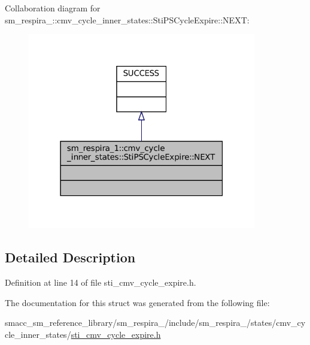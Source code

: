 Collaboration diagram for sm\+\_\+respira\+\_\+:\+:cmv\+\_\+cycle\+\_\+inner\+\_\+states\+:\+:Sti\+P\+S\+Cycle\+Expire\+:\+:N\+E\+XT\+:
\nopagebreak
\begin{figure}[H]
\begin{center}
\leavevmode
\includegraphics[width=283pt]{structsm__respira__1_1_1cmv__cycle__inner__states_1_1StiPSCycleExpire_1_1NEXT__coll__graph}
\end{center}
\end{figure}


\subsection{Detailed Description}


Definition at line 14 of file sti\+\_\+cmv\+\_\+cycle\+\_\+expire.\+h.



The documentation for this struct was generated from the following file\+:\begin{DoxyCompactItemize}
\item 
smacc\+\_\+sm\+\_\+reference\+\_\+library/sm\+\_\+respira\+\_/include/sm\+\_\+respira\+\_/states/cmv\+\_\+cycle\+\_\+inner\+\_\+states/\hyperlink{sti__cmv__cycle__expire_8h}{sti\+\_\+cmv\+\_\+cycle\+\_\+expire.\+h}\end{DoxyCompactItemize}
